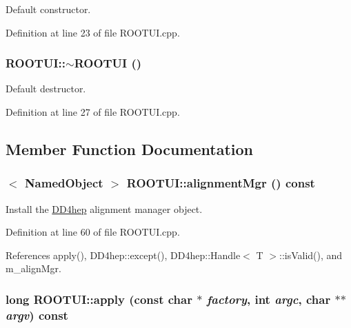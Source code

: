 Default constructor. 

Definition at line 23 of file ROOTUI.cpp.\hypertarget{class_d_d4hep_1_1_r_o_o_t_u_i_a029c3848c27bda2a4d12e706918c109f}{
\subsubsection[{$\sim$ROOTUI}]{\setlength{\rightskip}{0pt plus 5cm}ROOTUI::$\sim$ROOTUI ()}}
\label{class_d_d4hep_1_1_r_o_o_t_u_i_a029c3848c27bda2a4d12e706918c109f}


Default destructor. 

Definition at line 27 of file ROOTUI.cpp.

\subsection{Member Function Documentation}
\hypertarget{class_d_d4hep_1_1_r_o_o_t_u_i_ad04f23bceb40da60a17096f5f7e366e0}{
\subsubsection[{alignmentMgr}]{$<$ {\bf NamedObject} $>$ ROOTUI::alignmentMgr () const}}
\label{class_d_d4hep_1_1_r_o_o_t_u_i_ad04f23bceb40da60a17096f5f7e366e0}


Install the \hyperlink{namespace_d_d4hep}{DD4hep} alignment manager object. 

Definition at line 60 of file ROOTUI.cpp.

References apply(), DD4hep::except(), DD4hep::Handle$<$ T $>$::isValid(), and m\_\-alignMgr.\hypertarget{class_d_d4hep_1_1_r_o_o_t_u_i_a5c59ec6627aef8074bf2cf5bb7b82ec6}{
\subsubsection[{apply}]{\setlength{\rightskip}{0pt plus 5cm}long ROOTUI::apply (const char $\ast$ {\em factory}, \/  int {\em argc}, \/  char $\ast$$\ast$ {\em argv}) const}}
\label{class_d_d4hep_1_1_r_o_o_t_u_i_a5c59ec6627aef8074bf2cf5bb7b82ec6}


